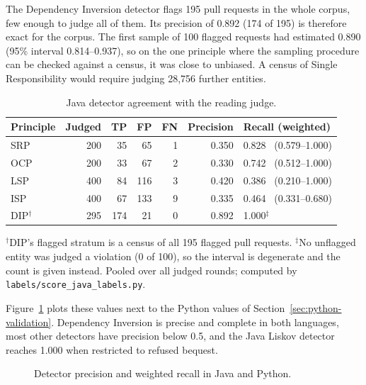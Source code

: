 The Dependency Inversion detector flags 195 pull requests in the whole corpus, few enough to judge
all of them. Its precision of 0.892 (174 of 195) is therefore exact for the corpus. The first sample
of 100 flagged requests had estimated 0.890 (95\% interval 0.814--0.937), so on the one principle
where the sampling procedure can be checked against a census, it was close to unbiased. A census of
Single Responsibility would require judging 28{,}756 further entities.

\begin{table}[htb]
\centering
\caption{Java detector agreement with the reading judge.}
\label{tab:validation}
\begin{tabular}{@{}lrrrrrl@{}}
\toprule
\textbf{Principle} & \textbf{Judged} & \textbf{TP} & \textbf{FP} & \textbf{FN} &
\textbf{Precision} & \textbf{Recall (weighted)} \\
\midrule
SRP & 200 & 35 & 65 & 1 & 0.350 & 0.828 \ (0.579--1.000) \\
OCP & 200 & 33 & 67 & 2 & 0.330 & 0.742 \ (0.512--1.000) \\
LSP & 400 & 84 & 116 & 3 & 0.420 & 0.386 \ (0.210--1.000) \\
ISP & 400 & 67 & 133 & 9 & 0.335 & 0.464 \ (0.331--0.680) \\
DIP$^\dagger$ & 295 & 174 & 21 & 0 & 0.892 & 1.000$^\ddagger$ \\
\bottomrule
\end{tabular}

\vspace{4pt}
\footnotesize $^\dagger$DIP's flagged stratum is a census of all 195 flagged pull requests.
$^\ddagger$No unflagged entity was judged a violation (0 of 100), so the interval is degenerate and
the count is given instead. Pooled over all judged rounds; computed by
\texttt{labels/score\_java\_labels.py}.
\end{table}

Figure~\ref{fig:validation-summary} plots these values next to the Python values of
Section~\ref{sec:python-validation}. Dependency Inversion is precise and complete in both languages,
most other detectors have precision below 0.5, and the Java Liskov detector reaches 1.000 when
restricted to refused bequest.

\begin{figure}[htb]
\centering

\caption{Detector precision and weighted recall in Java and Python.}
\label{fig:validation-summary}
\end{figure}

